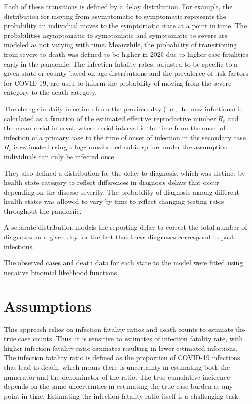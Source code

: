 \documentclass[12pt,twoside]{smiththesis}
\begin{document}
Each of these transitions is defined by a delay distribution. For example, the distribution for moving from asymptomatic to symptomatic represents the probability an individual moves to the symptomatic state at a point in time. The probabilities asymptomatic to symptomatic and symptomatic to severe are modeled as not varying with time. Meanwhile, the probability of transitioning from severe to death was defined to be higher in 2020 due to higher case fatalities early in the pandemic. The infection fatality rates, adjusted to be specific to a given state or county based on age distributions and the prevalence of risk factors for COVID-19, are used to inform the probability of moving from the severe category to the death category.

The change in daily infections from the previous day (i.e., the new infections) is calculated as a function of the estimated effective reproductive number \(R_t\) and the mean serial interval, where serial interval is the time from the onset of infection of a primary case to the time of onset of infection in the secondary case. \(R_t\) is estimated using a log-transformed cubic spline, under the assumption individuals can only be infected once.

They also defined a distribution for the delay to diagnosis, which was distinct by health state category to reflect differences in diagnosis delays that occur depending on the disease severity.
The probability of diagnosis among different health states was allowed to vary by time to reflect changing testing rates throughout the pandemic.

A separate distribution models the reporting delay to correct the total number of diagnoses on a given day for the fact that these diagnoses correspond to past infections.

The observed cases and death data for each state to the model were fitted using negative binomial likelihood functions.

\hypertarget{assumptions}{%
\section{Assumptions}\label{assumptions}}

This approach relies on infection fatality ratios and death counts to estimate the true case counts. Thus, it is sensitive to estimates of infection fatality rate, with higher infection fatality ratio estimates resulting in lower estimated infections. The infection fatality ratio is defined as the proportion of COVID-19 infections that lead to death, which means there is uncertainty in estimating both the numerator and the denominator of the ratio. The true cumulative incidence depends on the same uncertainties in estimating the true case burden at any point in time. Estimating the infection fatality ratio itself is a challenging task.
\end{document}
